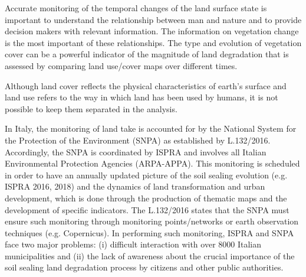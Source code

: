 \documentclass[APA,LATO1COL,doublespace]{WileyNJD-v2}
\begin{document}
Accurate monitoring of the temporal changes of the land surface state is important to understand the relationship between man and nature and to provide decision makers with relevant information.
The information on vegetation change is the most important of these relationships.
The type and evolution of vegetation cover can be a powerful indicator of the magnitude of land degradation that is assessed by comparing land use/cover maps over different times.

Although land cover reflects the physical characteristics of earth's surface and land use refers to the way in which land has been used by humans, it is not possible to keep them separated in the analysis.

In Italy, the monitoring of land take is accounted for by the National System for the Protection of the Environment (SNPA) as established by L.132/2016.
Accordingly, the SNPA is coordinated by ISPRA and involves all Italian Environmental Protection Agencies (ARPA-APPA). 
This monitoring is scheduled in order to have an annually updated picture of the soil sealing evolution (e.g. ISPRA 2016, 2018) and the dynamics of land transformation and urban development, which is done through the production of thematic maps and the development of specific indicators. 
The L.132/2016 states that the SNPA must ensure such monitoring through monitoring points/networks or earth observation techniques (e.g. Copernicus).
In performing such monitoring, ISPRA and SNPA face two major problems: (i) difficult interaction with over 8000 Italian municipalities and (ii) the lack of awareness about the crucial importance of the soil sealing land degradation process by citizens and other public authorities.
\end{document}
